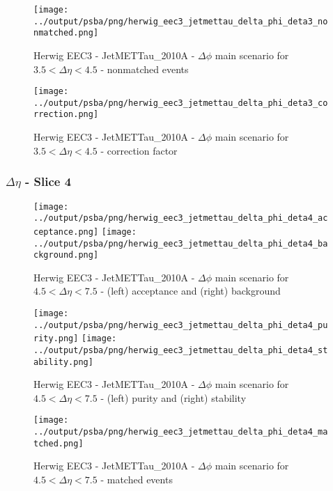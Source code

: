 \documentclass[11pt]{book}
\begin{document}
\begin{figure}[ht]
\centering
\texttt{[image: ../output/psba/png/herwig\_eec3\_jetmettau\_delta\_phi\_deta3\_nonmatched.png]}
\caption{Herwig EEC3 - JetMETTau\_2010A - $\Delta\phi$ main scenario for $3.5 < \Delta\eta < 4.5$ - nonmatched events}
\label{fig:hw_eec3_jetmettau_delta_phi_deta3_nonmatched}
\end{figure}

\begin{figure}[ht]
\centering
\texttt{[image: ../output/psba/png/herwig\_eec3\_jetmettau\_delta\_phi\_deta3\_correction.png]}
\caption{Herwig EEC3 - JetMETTau\_2010A - $\Delta\phi$ main scenario for $3.5 < \Delta\eta < 4.5$ - correction factor}
\label{fig:hw_eec3_jetmettau_delta_phi_deta3_correction}
\end{figure}

\clearpage
\subsubsection{$\Delta\eta$ - Slice 4}

\begin{figure}[ht]
\centering
\texttt{[image: ../output/psba/png/herwig\_eec3\_jetmettau\_delta\_phi\_deta4\_acceptance.png]}
\texttt{[image: ../output/psba/png/herwig\_eec3\_jetmettau\_delta\_phi\_deta4\_background.png]}
\caption{Herwig EEC3 - JetMETTau\_2010A - $\Delta\phi$ main scenario for $4.5 < \Delta\eta < 7.5$ - (left) acceptance and (right) background}
\label{fig:hw_eec3_jetmettau_delta_phi_deta4_ab}
\end{figure}

\begin{figure}[ht]
\centering
\texttt{[image: ../output/psba/png/herwig\_eec3\_jetmettau\_delta\_phi\_deta4\_purity.png]}
\texttt{[image: ../output/psba/png/herwig\_eec3\_jetmettau\_delta\_phi\_deta4\_stability.png]}
\caption{Herwig EEC3 - JetMETTau\_2010A - $\Delta\phi$ main scenario for $4.5 < \Delta\eta < 7.5$ - (left) purity and (right) stability}
\label{fig:hw_eec3_jetmettau_delta_phi_deta4_ps}
\end{figure}

\begin{figure}[ht]
\centering
\texttt{[image: ../output/psba/png/herwig\_eec3\_jetmettau\_delta\_phi\_deta4\_matched.png]}
\caption{Herwig EEC3 - JetMETTau\_2010A - $\Delta\phi$ main scenario for $4.5 < \Delta\eta < 7.5$ - matched events}
\label{fig:hw_eec3_jetmettau_delta_phi_deta4_matched}
\end{figure}
\end{document}
